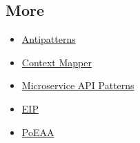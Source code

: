 \documentclass[../Main.tex]{subfiles}
\begin{document}
\subsection{More}
\begin{itemize}
    \item \href{https://architecture-antipatterns.tech/}{Antipatterns}
    \item \href{https://contextmapper.org/docs/home/}{Context Mapper}
    \item \href{https://microservice-api-patterns.org/}{Microservice API Patterns}
    \item \href{https://www.enterpriseintegrationpatterns.com/}{EIP}
    \item \href{https://martinfowler.com/eaaCatalog/}{PoEAA}
\end{itemize}
\end{document}
